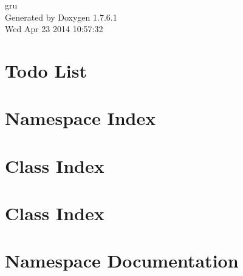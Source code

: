 \documentclass[a4paper]{book}
\begin{document}
\hypersetup{pageanchor=false,citecolor=blue}
\begin{titlepage}
\vspace*{7cm}
\begin{center}
{\Large gru }\\
\vspace*{1cm}
{\large \-Generated by Doxygen 1.7.6.1}\\
\vspace*{0.5cm}
{\small Wed Apr 23 2014 10:57:32}\\
\end{center}
\end{titlepage}
\clearemptydoublepage
{}
\tableofcontents
\clearemptydoublepage
{}
\hypersetup{pageanchor=true,citecolor=blue}
\chapter{\-Todo \-List}
\label{todo}
\hypertarget{todo}{}

\chapter{\-Namespace \-Index}

\chapter{\-Class \-Index}

\chapter{\-Class \-Index}

\chapter{\-Namespace \-Documentation}

\end{document}
